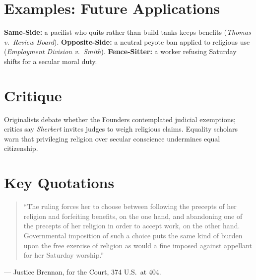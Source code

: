 \documentclass[12pt]{article}
\begin{document}
\section{Examples: Future Applications}
\textbf{Same-Side:} a pacifist who quits rather than build tanks keeps benefits (\textit{Thomas v.\ Review Board}). \textbf{Opposite-Side:} a neutral peyote ban applied to religious use (\textit{Employment Division v.\ Smith}). \textbf{Fence-Sitter:} a worker refusing Saturday shifts for a secular moral duty.

\section{Critique}
Originalists debate whether the Founders contemplated judicial exemptions; critics say \textit{Sherbert} invites judges to weigh religious claims. Equality scholars warn that privileging religion over secular conscience undermines equal citizenship.

\section{Key Quotations}
\begin{quote}
``The ruling forces her to choose between following the precepts of her religion and forfeiting benefits, on the one hand, and abandoning one of the precepts of her religion in order to accept work, on the other hand. Governmental imposition of such a choice puts the same kind of burden upon the free exercise of religion as would a fine imposed against appellant for her Saturday worship.''
\end{quote}
\noindent --- Justice Brennan, for the Court, 374 U.S.\ at 404.
\end{document}
